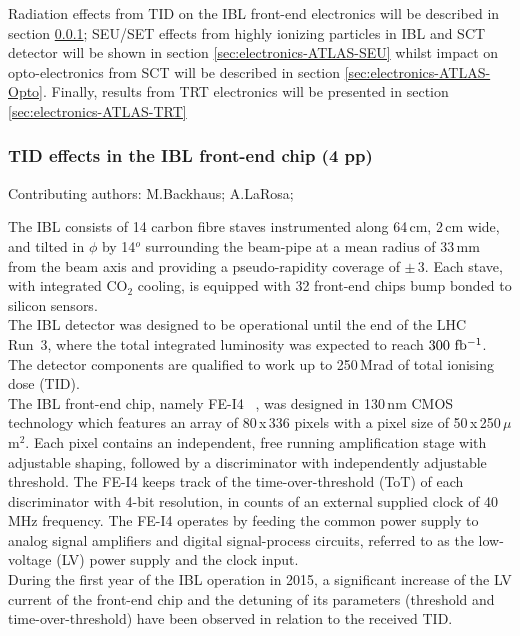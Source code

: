 Radiation effects from TID on the IBL front-end electronics will be described in section \ref{sec:electronics-ATLAS-TID}; SEU/SET effects from highly ionizing particles in IBL and SCT detector will be shown in section \ref{sec:electronics-ATLAS-SEU} whilst impact on opto-electronics from SCT will be described in section \ref{sec:electronics-ATLAS-Opto}. Finally, results from TRT electronics will be presented in section \ref{sec:electronics-ATLAS-TRT}

\subsubsection{TID effects in the IBL front-end chip (\textbf{4 pp})} 
\label{sec:electronics-ATLAS-TID}
Contributing authors: M.Backhaus; A.LaRosa;

\noindent 
The IBL consists of 14 carbon fibre staves instrumented along 64\,cm, 2\,cm wide, and tilted in $\phi$ by 14$^{o}$  surrounding the beam-pipe at a mean radius of 33\,mm  from the beam axis and providing a pseudo-rapidity coverage of $\pm$\,3. Each stave, with integrated CO$_{2}$ cooling, is equipped with 32 front-end chips bump bonded to silicon sensors.\\
The IBL detector was designed to be operational until the end of the LHC Run~3, where the total integrated luminosity was expected to reach $300~{\rm fb^{-1}}$. The detector components are qualified to work up to 250\,Mrad of total ionising dose (TID).\\
The IBL front-end chip,  namely FE-I4 ~\cite{FEI4},  was designed in 130\,nm CMOS technology which features an array of 80\,x\,336 pixels with a pixel size of 50\,x\,250\,$\mu$m$^{2}$. Each pixel contains an independent, free running amplification stage with adjustable shaping, followed by a discriminator with independently adjustable threshold. The FE-I4 keeps track of the time-over-threshold (ToT) of each discriminator with 4-bit resolution, in counts of an external supplied clock of 40\,MHz frequency.
The FE-I4 operates by feeding the common power supply to analog signal amplifiers and digital signal-process circuits, referred to as the low-voltage (LV) power supply and the clock input.\\
  
During the first year of the IBL operation in 2015, a significant increase of the LV current of the front-end chip and the detuning of its parameters (threshold and time-over-threshold) have been observed in relation to the received TID.

